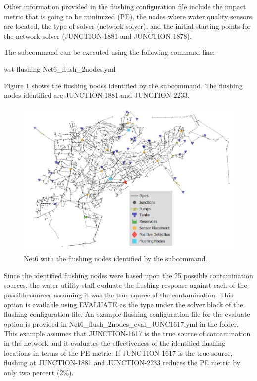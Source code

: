 Other information provided in the flushing configuration file include the 
impact metric that is going to be minimized (PE), the nodes where water 
quality sensors are located, the type of solver (network solver), 
and the initial starting points for the network solver (JUNCTION-1881 and 
JUNCTION-1878). 

The  subcommand can be executed using the following command line:

\begin{unknownListing}
wst flushing Net6_flush_2nodes.yml
\end{unknownListing}  

Figure \ref{fig:wds_flushing_nodes} shows the flushing nodes identified by 
the  subcommand. The flushing nodes identified are JUNCTION-1881 
and JUNCTION-2233.  

\begin{figure}[h!]
\begin{center}
\includegraphics[scale=0.6]{graphics/Net6_2nodes_flushing.JPG}
\caption{Net6 with the flushing nodes identified by the  subcommand.}
\label{fig:wds_flushing_nodes}
\end{center}
\end{figure}

Since the identified flushing nodes were based upon the 25 possible contamination sources, 
the water utility staff evaluate the flushing response against each of the possible 
sources assuming it was the true source of the contamination. This option is available 
using EVALUATE as the type under the solver block of the flushing configuration file. An 
example flushing configuration file for the evaluate option is provided in 
Net6\_flush\_2nodes\_eval\_JUNC1617.yml in the  folder. 
This example assumes that JUNCTION-1617 is the true source of contamination in the network 
and it evaluates the effectiveness of the identified flushing locations in terms of the 
PE metric. If JUNCTION-1617 is the true source, flushing at JUNCTION-1881 and JUNCTION-2233 
reduces the PE metric by only two percent (2\%).

